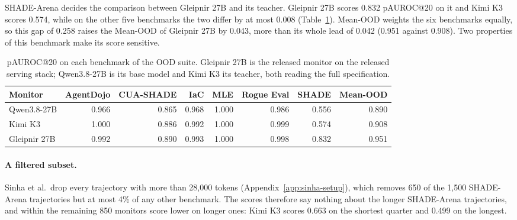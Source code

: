 SHADE-Arena decides the comparison between Gleipnir 27B and its teacher.
Gleipnir 27B scores 0.832 pAUROC@20 on it and Kimi K3 scores 0.574, while on the other five benchmarks the two differ by at most 0.008 (Table~\ref{tab:shade}).
Mean-OOD weights the six benchmarks equally, so this gap of 0.258 raises the Mean-OOD of Gleipnir 27B by 0.043, more than its whole lead of 0.042 (0.951 against 0.908).
Two properties of this benchmark make its score sensitive.

\begin{table}[h]
\caption{pAUROC@20 on each benchmark of the OOD suite. Gleipnir 27B is the released monitor on the released serving stack; Qwen3.8-27B is its base model and Kimi K3 its teacher, both reading the full specification.}
\label{tab:shade}
\centering
\small
\setlength{\tabcolsep}{4pt}
\begin{tabular}{@{}lrrrrrrr@{}}
\toprule
Monitor & AgentDojo & CUA-SHADE & IaC & MLE & Rogue Eval & SHADE & Mean-OOD \\
\midrule
Qwen3.8-27B & 0.966 & 0.865 & 0.968 & 1.000 & 0.986 & 0.556 & 0.890 \\
Kimi K3 & 1.000 & 0.886 & 0.992 & 1.000 & 0.999 & 0.574 & 0.908 \\
Gleipnir 27B & 0.992 & 0.890 & 0.993 & 1.000 & 0.998 & 0.832 & 0.951 \\
\bottomrule
\end{tabular}
\end{table}

\paragraph{A filtered subset.}
Sinha et al.\ drop every trajectory with more than 28,000 tokens (Appendix~\ref{app:sinha-setup}), which removes 650 of the 1,500 SHADE-Arena trajectories but at most 4\% of any other benchmark.
The scores therefore say nothing about the longer SHADE-Arena trajectories, and within the remaining 850 monitors score lower on longer ones: Kimi K3 scores 0.663 on the shortest quarter and 0.499 on the longest.

